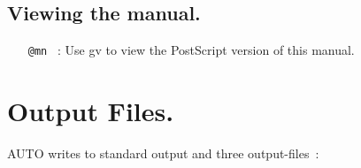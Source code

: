 \documentclass[12pt]{report}
\begin{document}
\section{ Viewing the manual.} 

\begin{itemize}

\item[\tt @mn]~: Use {\cal gv} to view the PostScript version of this manual.
\end{itemize}

\newpage

\chapter{ Output Files.} \label{ch:Output_files}
{\cal AUTO} writes to standard output and three output-files~:
\end{document}
